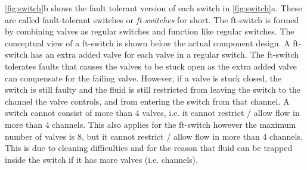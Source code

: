 \autoref{fig:switch}b shows the fault tolerant version of each switch in \autoref{fig:switch}a. These are called fault-tolerant switches or \emph{ft-switches} for short. The ft-switch is formed by combining valves as regular switches and function like regular switches. The conceptual view of a ft-switch is shown below the actual component design. A ft-switch has an extra added valve for each valve in a regular switch. The ft-switch tolerates faults that causes the valves to be stuck open as the extra added valve can compensate for the failing valve. However, if a valve is stuck closed, the switch is still faulty and the fluid is still restricted from leaving the switch to the channel the valve controls, and from entering the switch from that channel. A switch cannot consist of more than 4 valves, i.e. it cannot restrict / allow flow in more than 4 channels. This also applies for the ft-switch however the maximum number of valves is 8, but it cannot restrict / allow flow in more than 4 channels. This is due to cleaning difficulties and for the reason that fluid can be trapped inside the switch if it has more valves (i.e. channels).


